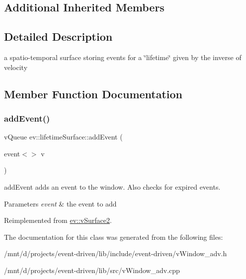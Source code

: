 \subsection*{Additional Inherited Members}


\subsection{Detailed Description}
a spatio-\/temporal surface storing events for a \char`\"{}lifetime\char`\"{} given by the inverse of velocity 

\subsection{Member Function Documentation}
\mbox{\label{classev_1_1lifetimeSurface_a8fce037a13281c0e46c7d660e0ea2275}} 
\subsubsection{\texorpdfstring{add\+Event()}{addEvent()}}
{\footnotesize\ttfamily v\+Queue ev\+::lifetime\+Surface\+::add\+Event (\begin{DoxyParamCaption}\item[{event$<$$>$}]{v }\end{DoxyParamCaption})\hspace{0.3cm}{\ttfamily [virtual]}}



add\+Event adds an event to the window. Also checks for expired events. 


\begin{DoxyParams}{Parameters}
{\em event} & the event to add \\
\hline
\end{DoxyParams}


Reimplemented from \hyperlink{classev_1_1vSurface2_a6dee662976048b73d7b19e45871352da}{ev\+::v\+Surface2}.



The documentation for this class was generated from the following files\+:\begin{DoxyCompactItemize}
\item 
/mnt/d/projects/event-\/driven/lib/include/event-\/driven/v\+Window\+\_\+adv.\+h\item 
/mnt/d/projects/event-\/driven/lib/src/v\+Window\+\_\+adv.\+cpp\end{DoxyCompactItemize}
